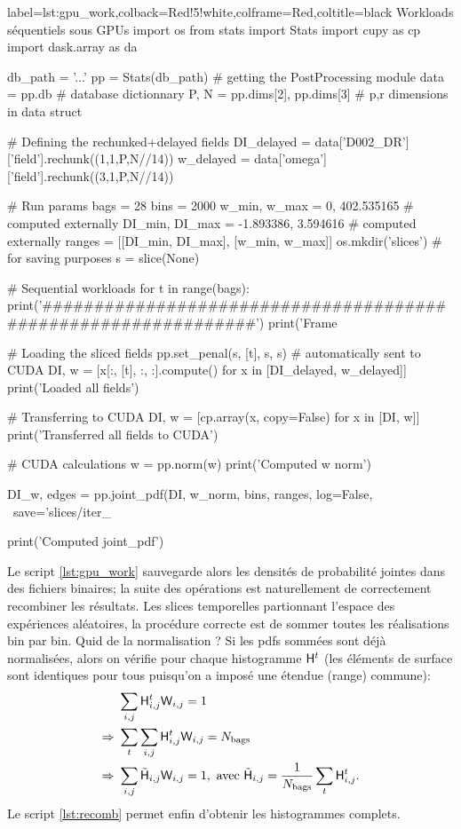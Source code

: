 \documentclass[13pt, a4paper]{extarticle}
\begin{document}
\noindent\begin{pythoncode}{label=lst:gpu_work,colback=Red!5!white,colframe=Red,coltitle=black}
  {Workloads séquentiels sous GPUs}
  import os
  from stats import Stats
  import cupy as cp
  import dask.array as da

  db_path = '...'
  pp = Stats(db_path)                    # getting the PostProcessing module
  data = pp.db                           # database dictionnary
  P, N = pp.dims[2], pp.dims[3]          # p,r dimensions in data struct

  # Defining the rechunked+delayed fields
  DI_delayed = data['D002_DR']['field'].rechunk((1,1,P,N//14))          
  w_delayed = data['omega']['field'].rechunk((3,1,P,N//14)) 

  # Run params
  bags = 28
  bins = 2000
  w_min, w_max = 0, 402.535165           # computed externally
  DI_min, DI_max = -1.893386, 3.594616   # computed externally
  ranges = [[DI_min, DI_max], [w_min, w_max]]
  os.mkdir('slices')                     # for saving purposes
  s = slice(None)

  # Sequential workloads
  for t in range(bags):
    print('###############################################################')
    print('Frame %
    
    # Loading the sliced fields
    pp.set_penal(s, [t], s, s)           # automatically sent to CUDA
    DI, w = [x[:, [t], :, :].compute() for x in [DI_delayed, w_delayed]]
    print('Loaded all fields')

    # Transferring to CUDA
    DI, w = [cp.array(x, copy=False) for x in [DI, w]]
    print('Transferred all fields to CUDA')

    # CUDA calculations
    w = pp.norm(w)                       
    print('Computed w norm')

    DI_w, edges = pp.joint_pdf(DI, w_norm, bins, ranges, log=False, \
                               save='slices/iter_%
    
    print('Computed joint_pdf')
\end{pythoncode}

\noindent Le script \ref{lst:gpu_work} sauvegarde alors les densités de probabilité
jointes dans des fichiers binaires; la suite des opérations est naturellement de
correctement recombiner les résultats. Les slices temporelles partionnant l'espace
des expériences aléatoires, la procédure correcte est de sommer toutes les réalisations
bin par bin. Quid de la normalisation ? Si les pdfs sommées sont déjà normalisées,
alors on vérifie pour chaque histogramme $\mathsf{H}^t$ (les éléments de surface sont identiques
pour tous puisqu'on a imposé une étendue (range) commune):
\begin{align}
    &\sum_{i,j}\mathsf{H}^t_{i,j}\mathsf{W}_{i,j} = 1 \\
    \Rightarrow~&\sum_{t}\sum_{i,j}\mathsf{H}^t_{i,j}\mathsf{W}_{i,j} = N_{\text{bags}} \\
    \Rightarrow~&\sum_{i,j}\tilde{\mathsf{H}}_{i,j}\mathsf{W}_{i,j} = 1,~\text{avec}~
    \tilde{\mathsf{H}}_{i,j} = \dfrac{1}{N_\text{bags}}\sum_t\mathsf{H}^t_{i,j}.
\end{align}
Le script \ref{lst:recomb} permet enfin d'obtenir les histogrammes complets.
\end{document}

